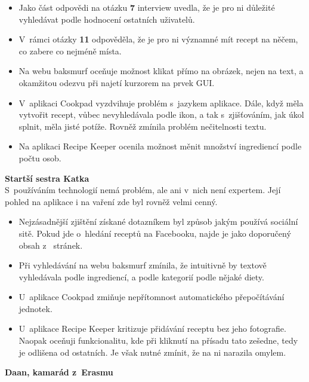 \documentclass[a4paper, 11pt]{article}
\begin{document}
    \begin{itemize}
        \item Jako část odpovědi na otázku \textbf{7} interview uvedla, že je pro ni důležité vyhledávat
        podle hodnocení ostatních uživatelů.
        \item V~rámci otázky \textbf{11} odpověděla, že je pro ni významné mít recept na něčem, co zabere
        co nejméně místa.
        \item Na webu baksmurf oceňuje možnost klikat přímo na obrázek, nejen na text, a
        okamžitou odezvu při najetí kurzorem na prvek GUI.
        \item V~aplikaci Cookpad vyzdvihuje problém s~jazykem aplikace. Dále, když měla vytvořit recept, vůbec 
        nevyhledávala podle ikon, a tak s~zjišťováním, jak úkol splnit, měla jisté potíže.
        Rovněž zmínila problém nečitelnosti textu.
        \item Na aplikaci Recipe Keeper ocenila možnost měnit množství ingrediencí podle počtu osob.
    \end{itemize}

    \noindent\textbf{Startší sestra Katka} \\[-1em]

    S~používáním technologií nemá problém, ale ani v~nich není expertem. Její pohled na aplikace i na vaření
    zde byl rovněž velmi cenný.

    \begin{itemize}
        \item Nejzásadnější zjištění získané dotazníkem byl způsob jakým používá sociální sitě. Pokud jde
        o~hledání receptů na Facebooku, najde je jako doporučený obsah z~ stránek.
        \item Při vyhledávání na webu baksmurf zmínila, že intuitivně by textově vyhledávala podle
        ingrediencí, a podle kategorií podle nějaké diety.
        \item U~aplikace Cookpad zmiňuje nepřítomnost automatického přepočítávání jednotek.
        \item U~aplikace Recipe Keeper kritizuje přidávání receptu bez jeho fotografie. Naopak
        oceňuji funkcionalitu, kde při kliknutí na přísadu tato zešedne, tedy je odlišena od ostatních.
        Je však nutné zmínit, že na ni narazila omylem.
    \end{itemize}

    \noindent\textbf{Daan, kamarád z~Erasmu} \\[-1em]
\end{document}
